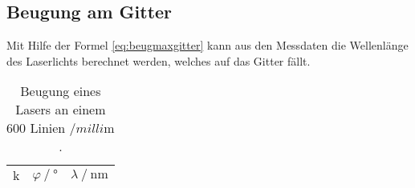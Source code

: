 \subsection{Beugung am Gitter}
\label{subsec:Gitter}
Mit Hilfe der Formel \eqref{eq:beugmaxgitter} kann aus den Messdaten die Wellenlänge des Laserlichts berechnet werden, welches auf das Gitter fällt.
\begin{table}[H]
  \centering
  \caption{Beugung eines Lasers an einem 600 Linien $\mathbin{/} \unit{milli\meter}$.}
  \label{tab:messung4a}
  \begin{tabular}{S S S}
    \toprule
      {$  \text{k} $} & {$\varphi \mathbin{/} \unit{\degree} $}  & {$ \lambda \mathbin{/} \unit{\nano\meter}$} \\
    \midrule

  \bottomrule
  \end{tabular}
\end{table}